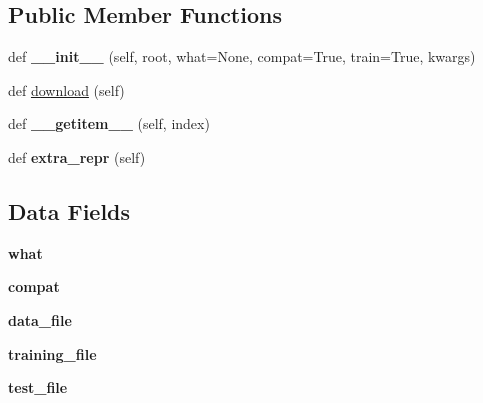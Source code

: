 \subsection*{Public Member Functions}
\begin{DoxyCompactItemize}
\item 
\mbox{\label{classtorchvision_1_1datasets_1_1mnist_1_1QMNIST_afe1c054f9875d84e06e078b24658263a}} 
def {\bfseries \+\_\+\+\_\+init\+\_\+\+\_\+} (self, root, what=None, compat=True, train=True, kwargs)
\item 
def \hyperlink{classtorchvision_1_1datasets_1_1mnist_1_1QMNIST_a1ffa23798789dbdb9d38f411d8419651}{download} (self)
\item 
\mbox{\label{classtorchvision_1_1datasets_1_1mnist_1_1QMNIST_a88a1a3b56065d8bc90fcad094f096ec0}} 
def {\bfseries \+\_\+\+\_\+getitem\+\_\+\+\_\+} (self, index)
\item 
\mbox{\label{classtorchvision_1_1datasets_1_1mnist_1_1QMNIST_aefd39f8c2e8e0ab604089000fe9168ab}} 
def {\bfseries extra\+\_\+repr} (self)
\end{DoxyCompactItemize}
\subsection*{Data Fields}
\begin{DoxyCompactItemize}
\item 
\mbox{\label{classtorchvision_1_1datasets_1_1mnist_1_1QMNIST_abf67a83e277b8f69ba2c421e685094e5}} 
{\bfseries what}
\item 
\mbox{\label{classtorchvision_1_1datasets_1_1mnist_1_1QMNIST_ad9155bf82b5bb8e5b3d840db3e3df81e}} 
{\bfseries compat}
\item 
\mbox{\label{classtorchvision_1_1datasets_1_1mnist_1_1QMNIST_a905a5660c130bb2f1211574e3237ceef}} 
{\bfseries data\+\_\+file}
\item 
\mbox{\label{classtorchvision_1_1datasets_1_1mnist_1_1QMNIST_a10b80c3b671fee29b9f76c58c244f99b}} 
{\bfseries training\+\_\+file}
\item 
\mbox{\label{classtorchvision_1_1datasets_1_1mnist_1_1QMNIST_a74b15dc6da961dc383f012aa29eb95b9}} 
{\bfseries test\+\_\+file}
\end{DoxyCompactItemize}
